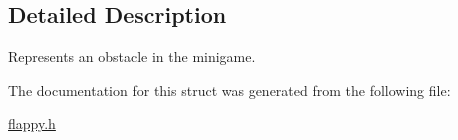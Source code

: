 \subsection{Detailed Description}
Represents an obstacle in the minigame. 

The documentation for this struct was generated from the following file\+:\begin{DoxyCompactItemize}
\item 
\mbox{\hyperlink{flappy_8h}{flappy.\+h}}\end{DoxyCompactItemize}
